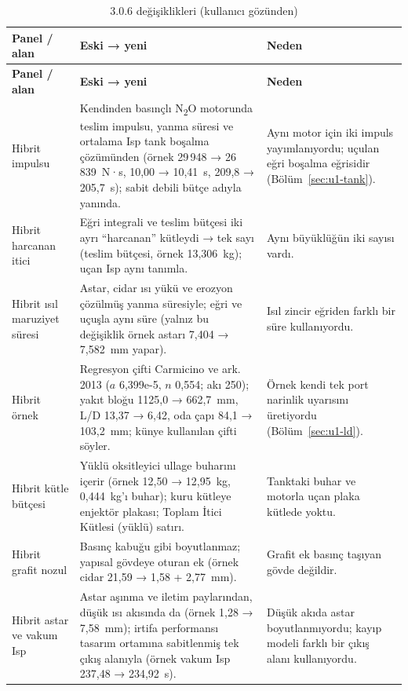 \documentclass[11pt,a4paper]{article}
\newcommand{\ui}[1]{\textsf{#1}}
\begin{document}
\begin{longtable}{@{}>{\raggedright\arraybackslash}p{3.0cm}>{\raggedright\arraybackslash}p{8.0cm}>{\raggedright\arraybackslash}p{4.6cm}@{}}
\caption{3.0.6 değişiklikleri (kullanıcı gözünden)}\label{tab:v306}\\
\toprule
\textbf{Panel / alan} & \textbf{Eski → yeni} & \textbf{Neden} \\
\midrule\endfirsthead
\toprule
\textbf{Panel / alan} & \textbf{Eski → yeni} & \textbf{Neden} \\
\midrule\endhead
\bottomrule\endlastfoot
Hibrit impulsu & Kendinden basınçlı N\textsubscript{2}O motorunda teslim impulsu, yanma süresi ve ortalama Isp tank boşalma çözümünden (örnek 29\,948 → 26\,839~N·s, 10,00 → 10,41~s, 209,8 → 205,7~s); sabit debili bütçe adıyla yanında. & Aynı motor için iki impuls yayımlanıyordu; uçulan eğri boşalma eğrisidir (Bölüm~\ref{sec:u1-tank}). \\
Hibrit harcanan itici & Eğri integrali ve teslim bütçesi iki ayrı ``harcanan'' kütleydi → tek sayı (teslim bütçesi, örnek 13,306~kg); uçan Isp aynı tanımla. & Aynı büyüklüğün iki sayısı vardı. \\
Hibrit ısıl maruziyet süresi & Astar, cidar ısı yükü ve erozyon çözülmüş yanma süresiyle; eğri ve uçuşla aynı süre (yalnız bu değişiklik örnek astarı 7,404 → 7,582~mm yapar). & Isıl zincir eğriden farklı bir süre kullanıyordu. \\
Hibrit örnek & Regresyon çifti Carmicino ve ark. 2013 ($a$ 6,399e-5, $n$ 0,554; akı 250); yakıt bloğu 1125,0 → 662,7~mm, L/D 13,37 → 6,42, oda çapı 84,1 → 103,2~mm; künye kullanılan çifti söyler. & Örnek kendi tek port narinlik uyarısını üretiyordu (Bölüm~\ref{sec:u1-ld}). \\
Hibrit kütle bütçesi & Yüklü oksitleyici ullage buharını içerir (örnek 12,50 → 12,95~kg, 0,444~kg'ı buhar); kuru kütleye enjektör plakası; \ui{Toplam İtici Kütlesi (yüklü)} satırı. & Tanktaki buhar ve motorla uçan plaka kütlede yoktu. \\
Hibrit grafit nozul & Basınç kabuğu gibi boyutlanmaz; yapısal gövdeye oturan ek (örnek cidar 21,59 → 1,58 + 2,77~mm). & Grafit ek basınç taşıyan gövde değildir. \\
Hibrit astar ve vakum Isp & Astar aşınma ve iletim paylarından, düşük ısı akısında da (örnek 1,28 → 7,58~mm); irtifa performansı tasarım ortamına sabitlenmiş tek çıkış alanıyla (örnek vakum Isp 237,48 → 234,92~s). & Düşük akıda astar boyutlanmıyordu; kayıp modeli farklı bir çıkış alanı kullanıyordu. \\

\end{longtable}
\end{document}

